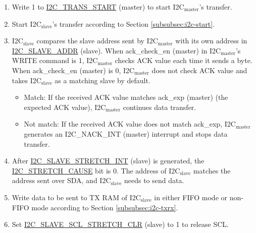 \documentclass[main\_\_EN.tex]{subfiles}
\begin{document}
\begin{enumerate}
\item Write 1 to \hyperref[fielddesc:I2CTRANSSTART]{I2C\_TRANS\_START} (master) to start I2C$_\text{master}$'s transfer.
\item Start I2C$_\text{slave}$'s transfer according to Section \ref{subsubsec:i2c-start}.
\item I2C$_\text{slave}$ compares the slave address sent by I2C$_\text{master}$ with its own address in \hyperref[fielddesc:I2CSLAVEADDR]{I2C\_SLAVE\_ADDR} (slave). When ack\_check\_en (master) in I2C$_\text{master}$'s WRITE command is 1, I2C$_\text{master}$ checks ACK value each time it sends a byte. When ack\_check\_en (master) is 0, I2C$_\text{master}$ does not check ACK value and takes I2C$_\text{slave}$ as a matching slave by default.
\begin{itemize}
\item Match: If the received ACK value matches ack\_exp (master) (the expected ACK value), I2C$_\text{master}$ continues data transfer.
\item Not match: If the received ACK value does not match ack\_exp, I2C$_\text{master}$ generates an I2C\_NACK\_INT (master) interrupt and stops data transfer.
\end{itemize}

\item After \hyperref[int:i2c-slave-stretch]{I2C\_SLAVE\_STRETCH\_INT} (slave) is generated, the \hyperref[fielddesc:I2CSTRETCHCAUSE]{I2C\_STRETCH\_CAUSE} bit is 0. The address of I2C$_\text{slave}$ matches the address sent over SDA, and I2C$_\text{slave}$ needs to send data.

\item Write data to be sent to TX RAM of I2C$_\text{slave}$ in either FIFO mode or non-FIFO mode according to Section \ref{subsubsec:i2c-txrx}.
\item Set \hyperref[fielddesc:I2CSLAVESCLSTRETCHCLR]{I2C\_SLAVE\_SCL\_STRETCH\_CLR} (slave) to 1 to release SCL.


\end{enumerate}
\end{document}
